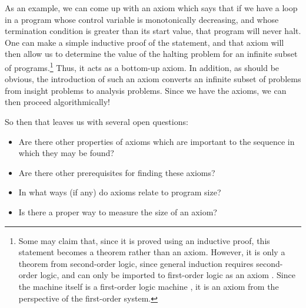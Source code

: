 As an example, we can come up with an axiom which says that if we have a loop in a program whose control variable is monotonically decreasing, and whose termination condition is greater than its start value, that program will never halt.  One can make a simple inductive proof of the statement, and that axiom will then allow us to determine the value of the halting problem for an infinite subset of programs.\footnote{Some may claim that, since it is proved using an inductive proof, this statement becomes a theorem rather than an axiom.  However, it is only a theorem from second-order logic, since general induction requires second-order logic, and can only be imported to first-order logic as an axiom \citep{enderton2012}.  Since the machine itself is a first-order logic machine \citep{turing1936}, it is an axiom from the perspective of the first-order system.}  Thus, it acts as a bottom-up axiom.  In addition, as should be obvious, the introduction of such an axiom converts an infinite subset of problems from insight problems to analysis problems.  Since we have the axioms, we can then proceed algorithmically!

So then that leaves us with several open questions:

\begin{itemize}
\item Are there other properties of axioms which are important to the sequence in which they may be found?
\item Are there other prerequisites for finding these axioms?
\item In what ways (if any) do axioms relate to program size?
\item Is there a proper way to measure the size of an axiom?
\end{itemize}

